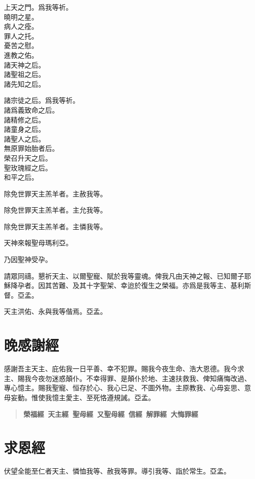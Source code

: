 \versicle 上天之門。\hfill \response 爲我等祈。\\
曉明之星。\\
病人之痊。\\
罪人之托。\\
憂苦之慰。\\
進教之佑。\\
諸天神之后。\\
諸聖祖之后。\\
諸先知之后。

\versicle 諸宗徒之后。\hfill \response 爲我等祈。\\
諸爲義致命之后。\\
諸精修之后。\\
諸童身之后。\\
諸聖人之后。\\
無原罪始胎者后。\\
榮召升天之后。\\
聖玫瑰經之后。\\
和平之后。

\versicle 除免世罪天主羔羊者。\hfill \response 主赦我等。

\versicle 除免世罪天主羔羊者。\hfill \response 主允我等。

\versicle 除免世罪天主羔羊者。\hfill \response 主憐我等。

\versicle 天神來報聖母瑪利亞。

\Response 乃因聖神受孕。

\versicle 請眾同禱。{\cspace}懇祈天主、以爾聖寵、賦於我等靈魂。俾我凡由天神之報、已知爾子耶穌降孕者。因其苦難、及其十字聖架、幸迨於復生之榮福。亦爲是我等主、基利斯督。\response 亞孟。

\versicle 天主洪佑、永與我等偕焉。\response 亞孟。

\section*{晚感謝經}
感謝吾主天主、庇佑我一日平善、幸不犯罪。賜我今夜生命、浩大恩德。我今求主、賜我今夜勿迷惑顛仆。不幸得罪、是顛仆於地、主速扶救我、俾知痛悔改過、專心憶主。賜我聖寵、恒存於心、我心已足、不圖外物。主原教我、心毋妄思、意毋妄動。惟使我憶主愛主、至死恪遵規誡。{\cspace}亞孟。

\begin{quote}
\bfseries 榮福經\ 天主經\ 聖母經\ 又聖母經\ 信經\ 解罪經\ 大悔罪經
\end{quote}

\section*{求恩經}
伏望全能至仁者天主、憐恤我等、赦我等罪。導引我等、詣於常生。{\cspace}亞孟。

